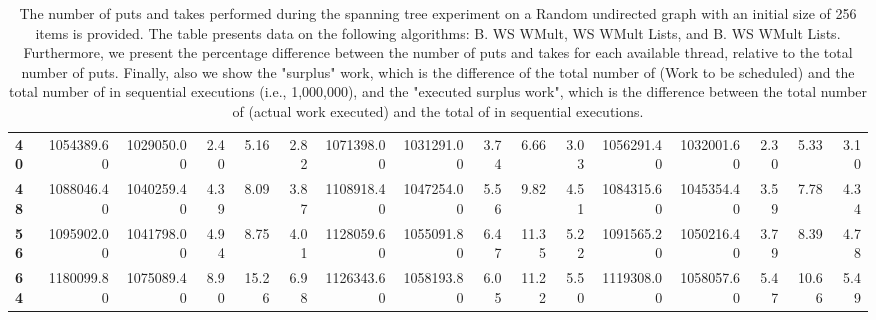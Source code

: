 \begin{table}[!ht]
{\begin{tabular}{lrrrrrrrrrrrrrrr}
\textbf{40} &  1054389.60 & 1029050.00 &           2.40 &        5.16 &                 2.82 &     1071398.00 & 1031291.00 &           3.74 &        6.66 &                 3.03 &        1056291.40 & 1032001.60 &           2.30 &        5.33 &                 3.10 \\
\textbf{48} &  1088046.40 & 1040259.40 &           4.39 &        8.09 &                 3.87 &     1108918.40 & 1047254.00 &           5.56 &        9.82 &                 4.51 &        1084315.60 & 1045354.40 &           3.59 &        7.78 &                 4.34 \\
\textbf{56} &  1095902.00 & 1041798.00 &           4.94 &        8.75 &                 4.01 &     1128059.60 & 1055091.80 &           6.47 &       11.35 &                 5.22 &        1091565.20 & 1050216.40 &           3.79 &        8.39 &                 4.78 \\
\textbf{64} &  1180099.80 & 1075089.40 &           8.90 &       15.26 &                 6.98 &     1126343.60 & 1058193.80 &           6.05 &       11.22 &                 5.50 &        1119308.00 & 1058057.60 &           5.47 &       10.66 &                 5.49 \\
\bottomrule
\end{tabular}}
\label{difference-Random_undirected-256-B_WS_NC_MULT_OPT-WS_NC_MULT_LA_OPT-B_WS_NC_MULT_LA_OPT}
\caption{The number of puts and takes performed during the
    spanning tree experiment on a Random undirected graph with an initial size
    of 256 items is provided. The table presents data on the
    following algorithms: B. WS WMult, WS WMult Lists, and
    B. WS WMult Lists. Furthermore, we present the percentage difference
    between the number of puts and takes for each available thread,
    relative to the total number of puts. Finally, also we show the
    "surplus" work, which is the difference of the total number of
    \Puts (Work to be scheduled) and the total number of \Puts in
    sequential executions (i.e., 1,000,000), and the "executed surplus
    work", which is the difference between the total number of \Takes
    (actual work executed) and the total of \Takes in sequential
    executions.}
\end{table}
